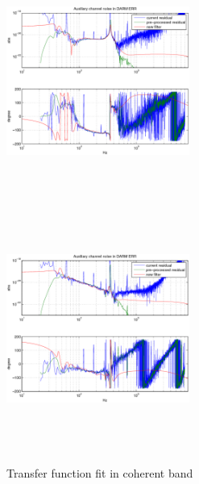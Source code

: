 \begin{figure}
\includegraphics[height=80mm, width=60mm]{clip-MICH-fit.eps}
\includegraphics[height=80mm, width=60mm]{clip-PRC-fit.eps}
\caption{Transfer function fit in coherent band}
\end{figure}
